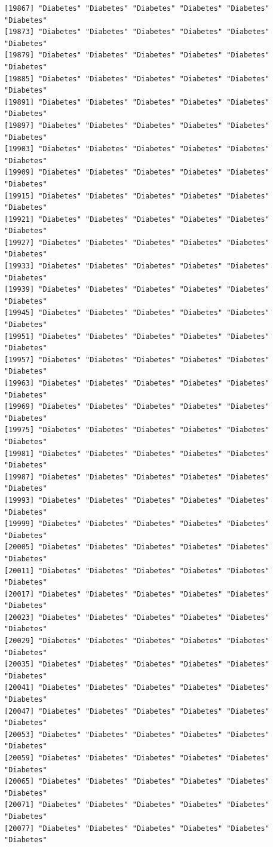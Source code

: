 \documentclass[
  letterpaper,
  DIV=11,
  numbers=noendperiod]{scrartcl}
\begin{document}
\begin{verbatim}
[19867] "Diabetes" "Diabetes" "Diabetes" "Diabetes" "Diabetes" "Diabetes"
[19873] "Diabetes" "Diabetes" "Diabetes" "Diabetes" "Diabetes" "Diabetes"
[19879] "Diabetes" "Diabetes" "Diabetes" "Diabetes" "Diabetes" "Diabetes"
[19885] "Diabetes" "Diabetes" "Diabetes" "Diabetes" "Diabetes" "Diabetes"
[19891] "Diabetes" "Diabetes" "Diabetes" "Diabetes" "Diabetes" "Diabetes"
[19897] "Diabetes" "Diabetes" "Diabetes" "Diabetes" "Diabetes" "Diabetes"
[19903] "Diabetes" "Diabetes" "Diabetes" "Diabetes" "Diabetes" "Diabetes"
[19909] "Diabetes" "Diabetes" "Diabetes" "Diabetes" "Diabetes" "Diabetes"
[19915] "Diabetes" "Diabetes" "Diabetes" "Diabetes" "Diabetes" "Diabetes"
[19921] "Diabetes" "Diabetes" "Diabetes" "Diabetes" "Diabetes" "Diabetes"
[19927] "Diabetes" "Diabetes" "Diabetes" "Diabetes" "Diabetes" "Diabetes"
[19933] "Diabetes" "Diabetes" "Diabetes" "Diabetes" "Diabetes" "Diabetes"
[19939] "Diabetes" "Diabetes" "Diabetes" "Diabetes" "Diabetes" "Diabetes"
[19945] "Diabetes" "Diabetes" "Diabetes" "Diabetes" "Diabetes" "Diabetes"
[19951] "Diabetes" "Diabetes" "Diabetes" "Diabetes" "Diabetes" "Diabetes"
[19957] "Diabetes" "Diabetes" "Diabetes" "Diabetes" "Diabetes" "Diabetes"
[19963] "Diabetes" "Diabetes" "Diabetes" "Diabetes" "Diabetes" "Diabetes"
[19969] "Diabetes" "Diabetes" "Diabetes" "Diabetes" "Diabetes" "Diabetes"
[19975] "Diabetes" "Diabetes" "Diabetes" "Diabetes" "Diabetes" "Diabetes"
[19981] "Diabetes" "Diabetes" "Diabetes" "Diabetes" "Diabetes" "Diabetes"
[19987] "Diabetes" "Diabetes" "Diabetes" "Diabetes" "Diabetes" "Diabetes"
[19993] "Diabetes" "Diabetes" "Diabetes" "Diabetes" "Diabetes" "Diabetes"
[19999] "Diabetes" "Diabetes" "Diabetes" "Diabetes" "Diabetes" "Diabetes"
[20005] "Diabetes" "Diabetes" "Diabetes" "Diabetes" "Diabetes" "Diabetes"
[20011] "Diabetes" "Diabetes" "Diabetes" "Diabetes" "Diabetes" "Diabetes"
[20017] "Diabetes" "Diabetes" "Diabetes" "Diabetes" "Diabetes" "Diabetes"
[20023] "Diabetes" "Diabetes" "Diabetes" "Diabetes" "Diabetes" "Diabetes"
[20029] "Diabetes" "Diabetes" "Diabetes" "Diabetes" "Diabetes" "Diabetes"
[20035] "Diabetes" "Diabetes" "Diabetes" "Diabetes" "Diabetes" "Diabetes"
[20041] "Diabetes" "Diabetes" "Diabetes" "Diabetes" "Diabetes" "Diabetes"
[20047] "Diabetes" "Diabetes" "Diabetes" "Diabetes" "Diabetes" "Diabetes"
[20053] "Diabetes" "Diabetes" "Diabetes" "Diabetes" "Diabetes" "Diabetes"
[20059] "Diabetes" "Diabetes" "Diabetes" "Diabetes" "Diabetes" "Diabetes"
[20065] "Diabetes" "Diabetes" "Diabetes" "Diabetes" "Diabetes" "Diabetes"
[20071] "Diabetes" "Diabetes" "Diabetes" "Diabetes" "Diabetes" "Diabetes"
[20077] "Diabetes" "Diabetes" "Diabetes" "Diabetes" "Diabetes" "Diabetes"

\end{verbatim}
\end{document}
